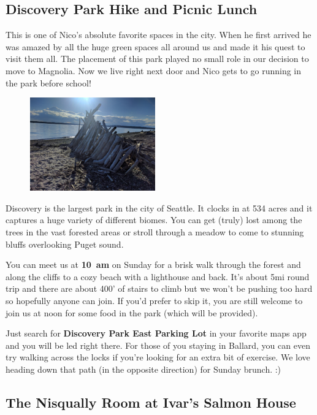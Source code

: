 \documentclass[10pt]{article}
\begin{document}
\subsection{Discovery Park Hike and Picnic Lunch}
This is one of Nico's absolute favorite spaces in the city. When he first arrived he was amazed 
by all the huge green spaces all around us and made it his quest to visit them all. The placement of 
this park played no small role in our decision to move to Magnolia. Now we live right next door and Nico gets to go running in the park
before school!\hfill
\label{subsec-discovery}
\begin{figure}
    \begin{center}
        \includegraphics[width=0.48\textwidth]{leanto}
    \end{center}
\end{figure}

Discovery is the largest park in the city of Seattle. It clocks in at 534 acres and it captures
a huge variety of different biomes. You can get (truly) lost among the trees in the vast
forested areas or stroll through a meadow to come to stunning bluffs overlooking Puget sound.

You can meet us at \textbf{10~am} on Sunday for a brisk walk through the forest and along the cliffs
to a cozy beach with a lighthouse and back. It's about 5mi round trip and there are about 400' of stairs
to climb but we won't be pushing too hard so hopefully anyone can join. If you'd prefer to skip it, you are 
still welcome to join us at noon for some food in the park (which will be provided).

Just search for \textbf{Discovery Park East Parking Lot} in your favorite maps app and you will be led right there. For those of you
staying in Ballard, you can even try walking across the locks if you're looking for an extra bit of exercise. We love heading
down that path (in the opposite direction) for Sunday brunch. :)

\subsection{The Nisqually Room at Ivar's Salmon House}
\label{subsec-ivars}
\end{document}
